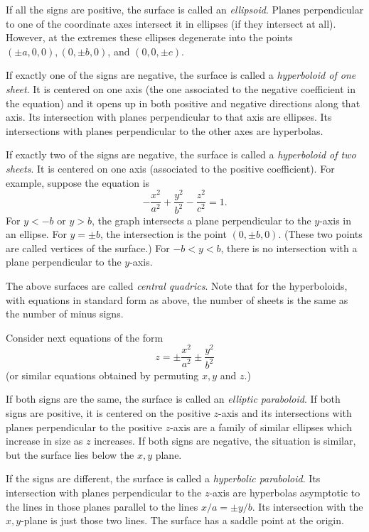 If all the signs are positive, the surface is called an {\it 
ellipsoid}.
%
Planes perpendicular to one of the coordinate axes intersect it
in ellipses (if they intersect at all).   However, at the extremes
these ellipses degenerate into the points $(\pm a, 0, 0),
(0,\pm b, 0)$, and $(0,0,\pm c)$.
\medskip
\centerline{}
\medskip
If exactly one of the signs are negative, the surface is called a
{\it hyperboloid of one sheet}.   It is centered on one axis
%
(the one associated to the negative coefficient in the equation)
and it opens up in both positive and negative directions along
that axis.  Its intersection with planes perpendicular to that
axis are ellipses.   Its intersections with planes perpendicular to
the other axes are hyperbolas.

If exactly two of the signs are negative, the surface is called
a {\it hyperboloid of two sheets}.   It is centered on one
%
axis (associated to the positive coefficient).  For example,
suppose the equation is
$$
  -\frac{x^2}{a^2}
  +\frac{y^2}{b^2}
  -\frac{z^2}{c^2} = 1.
$$
For $y < -b$ or $y > b$, the graph intersects a plane perpendicular
to the $y$-axis in an ellipse.  For $y = \pm b$, the intersection
is the point $(0,\pm b, 0)$.  (These two points are called vertices
of the surface.)  For $-b < y < b$, there is no intersection with
a plane perpendicular to the $y$-axis.

The above surfaces are called {\it central quadrics\/}.
%
Note that for the hyperboloids, with equations in standard form as
above, the number of sheets is the same as
the number of minus signs.

Consider next equations of the form
$$
   z = \pm \frac{x^2}{a^2} \pm \frac{y^2}{b^2}
$$
(or similar equations obtained by permuting $x, y$ and $z$.)

If both signs are the same, the surface is called an {\it elliptic
paraboloid}.   If both signs are positive, it is centered on the
%
%
positive $z$-axis and its intersections with planes perpendicular to
the positive $z$-axis are a family of similar ellipses which increase
in size as $z$ increases.   If both signs are negative, the situation
is similar, but the surface lies below the $x,y$ plane.

If the signs are different, the surface is called a {\it
hyperbolic paraboloid}.  Its intersection with planes perpendicular
to the $z$-axis are hyperbolas asymptotic to the lines in
those planes parallel to the lines $x/a = \pm y/b$.   Its intersection
with the $x,y$-plane is just those two lines.  The surface has
a saddle point at the origin.
%
%
%

